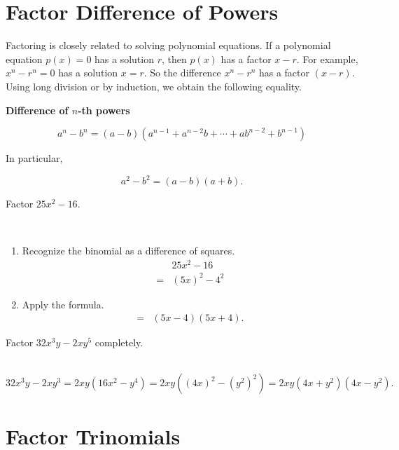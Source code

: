 \documentclass[en,12pt]{elegantbook}
\let\BeginKnitrBlock\begin \let\EndKnitrBlock\end
\begin{document}
\hypertarget{factor-difference-of-powers}{%
\section{Factor Difference of Powers}\label{factor-difference-of-powers}}

Factoring is closely related to solving polynomial equations. If a polynomial equation \(p(x)=0\) has a solution \(r\), then \(p(x)\) has a factor \(x-r\). For example, \(x^n-r^n=0\) has a solution \(x=r\). So the difference \(x^n-r^n\) has a factor \((x-r)\). Using long division or by induction, we obtain the following equality.

\textbf{Difference of \(n\)-th powers}

\[a^n-b^n=(a-b)(a^{n-1}+a^{n-2}b+\cdots +ab^{n-2}+b^{n-1})\]

In particular,

\[a^2-b^2=(a-b)(a+b).\]

\BeginKnitrBlock{example}
\protect\hypertarget{exm:unnamed-chunk-20}{}{\label{exm:unnamed-chunk-20} }
Factor \(25x^2-16\).
\EndKnitrBlock{example}

\BeginKnitrBlock{solution}
{}\\

\begin{enumerate}
\def\labelenumi{\arabic{enumi}.}
\item
  Recognize the binomial as a difference of squares.
  \[\begin{aligned}
  &25x^2-16\\
  =&(5x)^2-4^2
  \end{aligned}
  \]
\item
  Apply the formula.
  \[
  \begin{aligned}
  =&(5x-4)(5x+4).
  \end{aligned}
  \]
\end{enumerate}
\EndKnitrBlock{solution}

\BeginKnitrBlock{example}
\protect\hypertarget{exm:unnamed-chunk-22}{}{\label{exm:unnamed-chunk-22} }
Factor \(32x^3y-2xy^5\) completely.
\EndKnitrBlock{example}

\BeginKnitrBlock{solution}
{}\\

\[
32x^3y-2xy^3=2xy(16x^2-y^4)=2xy((4x)^2-(y^2)^2)=2xy(4x+y^2)(4x-y^2).
\]
\EndKnitrBlock{solution}

\hypertarget{factor-trinomials}{%
\section{Factor Trinomials}\label{factor-trinomials}}
\end{document}
